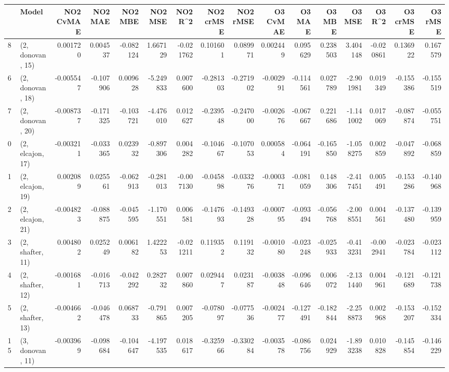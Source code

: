 \begin{tabular}{llrrrrrrrrrrrrrr}
\toprule
{} &             Model &  NO2 CvMAE &   NO2 MAE &   NO2 MBE &    NO2 MSE &   NO2 R\textasciicircum2 &  NO2 crMSE &  NO2 rMSE &  O3 CvMAE &    O3 MAE &    O3 MBE &     O3 MSE &    O3 R\textasciicircum2 &  O3 crMSE &   O3 rMSE \\
\midrule
8  &  (2, donovan, 15) &   0.001720 &  0.004537 & -0.082124 &   1.667129 & -0.021762 &   0.101601 &  0.089971 &  0.002449 &  0.095629 &  0.238503 &   3.404148 & -0.020861 &  0.136922 &  0.167579 \\
6  &  (2, donovan, 18) &  -0.005547 & -0.107906 &  0.009628 &  -5.249833 &  0.007600 &  -0.281303 & -0.271902 & -0.002991 & -0.114561 &  0.027789 &  -2.901981 &  0.019349 & -0.155386 & -0.155519 \\
7  &  (2, donovan, 20) &  -0.008737 & -0.171325 & -0.103721 &  -4.476010 &  0.012627 &  -0.239548 & -0.247000 & -0.002676 & -0.067667 &  0.221686 &  -1.141002 &  0.017069 & -0.087874 & -0.055751 \\
0  &  (2, elcajon, 17) &  -0.003211 & -0.033365 &  0.023932 &  -0.897306 &  0.004282 &  -0.104667 & -0.107053 &  0.000584 & -0.064191 & -0.165850 &  -1.058275 &  0.002859 & -0.047892 & -0.068859 \\
1  &  (2, elcajon, 19) &   0.002089 &  0.025561 & -0.062913 &  -0.281013 & -0.007130 &  -0.045898 & -0.033276 & -0.000371 & -0.081059 &  0.148306 &  -2.417451 &  0.005491 & -0.153286 & -0.140968 \\
2  &  (2, elcajon, 21) &  -0.004823 & -0.088875 & -0.045595 &  -1.170551 &  0.006581 &  -0.147693 & -0.149328 & -0.000795 & -0.093494 & -0.056768 &  -2.008551 &  0.004561 & -0.137480 & -0.139959 \\
3  &  (2, shafter, 11) &   0.004802 &  0.025249 &  0.006182 &   1.422253 & -0.021211 &   0.119352 &  0.119132 & -0.001080 & -0.023248 & -0.025933 &  -0.413231 & -0.002941 & -0.023784 & -0.023112 \\
4  &  (2, shafter, 12) &  -0.001681 & -0.016713 & -0.042292 &   0.282732 &  0.007860 &   0.029447 &  0.023187 & -0.003848 & -0.096646 &  0.006072 &  -2.131440 &  0.004961 & -0.121689 & -0.121738 \\
5  &  (2, shafter, 13) &  -0.004662 & -0.046478 &  0.068733 &  -0.791865 &  0.007205 &  -0.078097 & -0.077536 & -0.002477 & -0.127491 & -0.182844 &  -2.258873 &  0.002968 & -0.153207 & -0.152334 \\
15 &  (3, donovan, 11) &  -0.003969 & -0.098684 & -0.104647 &  -4.197535 &  0.018617 &  -0.325966 & -0.330284 & -0.003578 & -0.086756 &  0.024929 &  -1.893238 &  0.010828 & -0.145854 & -0.146229 \\

\end{tabular}
